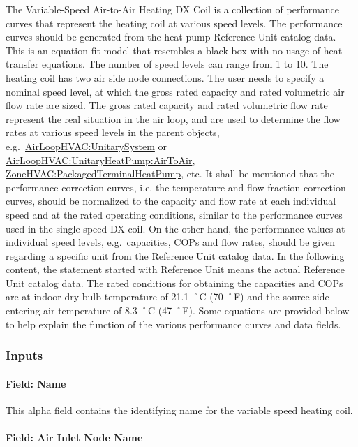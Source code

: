 The Variable-Speed Air-to-Air Heating DX Coil is a collection of performance curves that represent the heating coil at various speed levels. The performance curves should be generated from the heat pump Reference Unit catalog data. This is an equation-fit model that resembles a black box with no usage of heat transfer equations. The number of speed levels can range from 1 to 10. The heating coil has two air side node connections. The user needs to specify a nominal speed level, at which the gross rated capacity and rated volumetric air flow rate are sized. The gross rated capacity and rated volumetric flow rate represent the real situation in the air loop, and are used to determine the flow rates at various speed levels in the parent objects, e.g.~\hyperref[airloophvacunitarysystem]{AirLoopHVAC:UnitarySystem} or \hyperref[airloophvacunitaryheatpumpairtoair]{AirLoopHVAC:UnitaryHeatPump:AirToAir}, \hyperref[zonehvacpackagedterminalheatpump]{ZoneHVAC:PackagedTerminalHeatPump}, etc. It shall be mentioned that the performance correction curves, i.e. the temperature and flow fraction correction curves, should be normalized to the capacity and flow rate at each individual speed and at the rated operating conditions, similar to the performance curves used in the single-speed DX coil. On the other hand, the performance values at individual speed levels, e.g.~capacities, COPs and flow rates, should be given regarding a specific unit from the Reference Unit catalog data. In the following content, the statement started with Reference Unit means the actual Reference Unit catalog data. The rated conditions for obtaining the capacities and COPs are at indoor dry-bulb temperature of 21.1 ˚C (70 ˚F) and the source side entering air temperature of 8.3 ˚C (47 ˚F). Some equations are provided below to help explain the function of the various performance curves and data fields.

\subsubsection{Inputs}\label{inputs-21-001}

\paragraph{Field: Name}\label{field-name-20-000}

This alpha field contains the identifying name for the variable speed heating coil.

\paragraph{Field: Air Inlet Node Name}\label{field-air-inlet-node-name-15}

